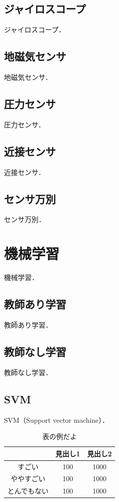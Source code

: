 \subsection{ジャイロスコープ}
ジャイロスコープ．

\subsection{地磁気センサ}
地磁気センサ．

\subsection{圧力センサ}
圧力センサ．

\subsection{近接センサ}
近接センサ．

\subsection{センサ万別}
センサ万別．

\section{機械学習}
機械学習．

\subsection{教師あり学習} 
教師あり学習．

\subsection{教師なし学習} 
教師なし学習．

\subsection{SVM}
SVM（Support vector machine）\cite{cortes1995}．


\begin{table}[t]
    \caption{表の例だよ}
    \label{tab:sample}
    \centering
    \begin{tabular}{|c||c|c|}
    \hline
     & 見出し1 & 見出し2 \\ \hline \hline
    すごい & 100 & 1000 \\ \hline
    ややすごい & 100 & 1000 \\ \hline
    とんでもない & 100 & 1000 \\ \hline
    \end{tabular}
\end{table}

